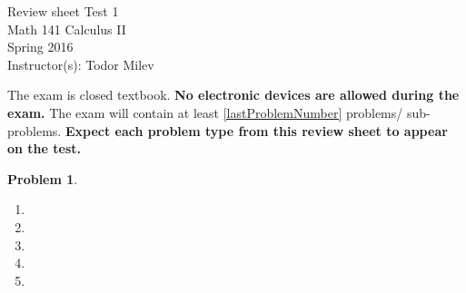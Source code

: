 \documentclass{article}
\renewcommand{\fcProblemRef}{\theproblem.\theenumi}
\newtheorem{problem}{Problem}
\begin{document}
\begin{center}
\Large
Review sheet Test 1 \\ Math 141 Calculus II \\ \normalsize Spring 2016 \\ Instructor(s): Todor Milev
\end{center}



\noindent The exam is closed textbook. \textbf{No electronic devices are allowed during the exam. } The exam will contain at least \ref{lastProblemNumber} problems/ sub-problems. \textbf{Expect each problem type from this review sheet to appear on the test.}%

\begin{problem}
\begin{multicols}{2}
\begin{enumerate}[ref={\fcProblemRef}]
\item 
\item 
\item 
\item 
\item 
\end{enumerate}
\end{multicols}
\end{problem}

\end{document}
